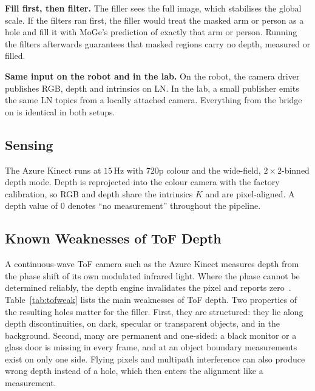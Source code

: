 \documentclass[conference]{IEEEtran}
\begin{document}
\textbf{Fill first, then filter.} The filler sees the full image, which
stabilises the global scale. If the filters ran first, the filler would treat
the masked arm or person as a hole and fill it with MoGe's prediction of
exactly that arm or person. Running the filters afterwards guarantees that
masked regions carry no depth, measured or filled.

\textbf{Same input on the robot and in the lab.} On the robot, the camera
driver publishes RGB, depth and intrinsics on LN. In the lab, a small
publisher emits the same LN topics from a locally attached camera. Everything
from the bridge on is identical in both setups.

\subsection{Sensing}
\label{sec:sensor}
The Azure Kinect runs at \(15\,\)Hz with \(720\)p colour and the wide-field,
\(2{\times}2\)-binned depth mode. Depth is reprojected into the colour camera
with the factory calibration, so RGB and depth share the intrinsics \(K\) and
are pixel-aligned. A depth value of \(0\) denotes ``no measurement'' throughout
the pipeline.

\subsection{Known Weaknesses of ToF Depth}
\label{sec:tofweak}
A continuous-wave ToF camera such as the Azure Kinect measures depth from the
phase shift of its own modulated infrared light. Where the phase cannot be
determined reliably, the depth engine invalidates the pixel and reports
zero~\cite{msft2024kinectdepth}. Table~\ref{tab:tofweak} lists the main
weaknesses of ToF depth. Two properties of the resulting holes matter for the
filler. First, they are structured: they lie along depth discontinuities, on
dark, specular or transparent objects, and in the background. Second, many
are permanent and one-sided: a black monitor or a glass door is missing in
every frame, and at an object boundary measurements exist on only one side.
Flying pixels and multipath interference can also produce wrong depth instead
of a hole, which then enters the alignment like a measurement.
\end{document}
